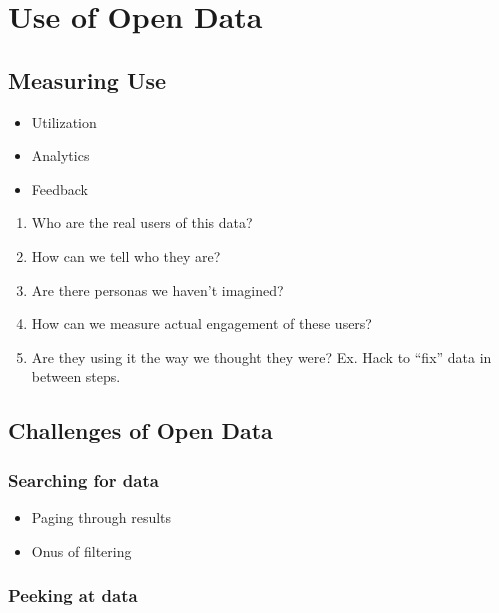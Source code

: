 \documentclass[
  openany]{book}
\providecommand{\tightlist}{%
  \setlength{\itemsep}{0pt}\setlength{\parskip}{0pt}}
\begin{document}
\hypertarget{use}{%
\chapter{Use of Open Data}\label{use}}

\hypertarget{measuring-use}{%
\section{Measuring Use}\label{measuring-use}}

\begin{itemize}
\tightlist
\item
  Utilization
\item
  Analytics
\item
  Feedback
\end{itemize}

\begin{enumerate}
\def\labelenumi{\arabic{enumi}.}
\tightlist
\item
  Who are the real users of this data?
\item
  How can we tell who they are?
\item
  Are there personas we haven't imagined?
\item
  How can we measure actual engagement of these users?
\item
  Are they using it the way we thought they were? Ex. Hack to ``fix'' data in between steps.
\end{enumerate}

\hypertarget{challenges-of-open-data}{%
\section{Challenges of Open Data}\label{challenges-of-open-data}}

\hypertarget{searching-for-data}{%
\subsection{Searching for data}\label{searching-for-data}}

\begin{itemize}
\tightlist
\item
  Paging through results
\item
  Onus of filtering
\end{itemize}

\hypertarget{peeking-at-data}{%
\subsection{Peeking at data}\label{peeking-at-data}}
\end{document}
